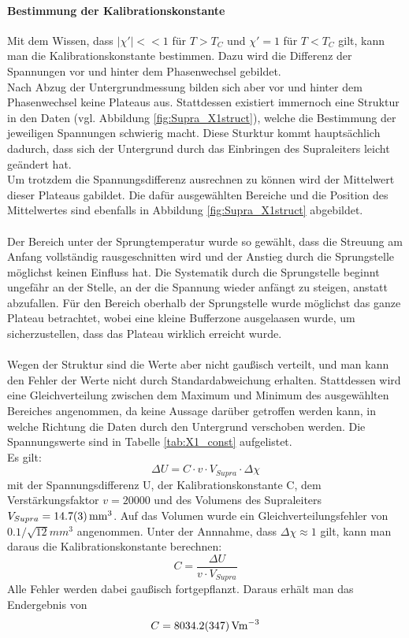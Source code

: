 \documentclass[12pt,a4paper]{article}
\begin{document}
\paragraph{Bestimmung der Kalibrationskonstante}
Mit dem Wissen, dass $|\chi'| << 1$ für $T>T_C$ und $\chi' = 1$ für $T<T_C$ gilt, kann man die Kalibrationskonstante bestimmen. Dazu wird die Differenz der Spannungen vor und hinter dem Phasenwechsel gebildet.\\
Nach Abzug der Untergrundmessung bilden sich aber vor und hinter dem Phasenwechsel keine Plateaus aus. Stattdessen existiert immernoch eine Struktur in den Daten (vgl. Abbildung \ref{fig:Supra_X1struct}), welche die Bestimmung der jeweiligen Spannungen schwierig macht. Diese Sturktur kommt hauptsächlich dadurch, dass sich der Untergrund durch das Einbringen des Supraleiters leicht geändert hat.\\
Um trotzdem die Spannungsdifferenz ausrechnen zu können wird der Mittelwert dieser Plateaus gabildet. Die dafür ausgewählten Bereiche und die Position des Mittelwertes sind ebenfalls in Abbildung \ref{fig:Supra_X1struct} abgebildet.\\
\\
Der Bereich unter der Sprungtemperatur wurde so gewählt, dass die Streuung am Anfang vollständig rausgeschnitten wird und der Anstieg durch die Sprungstelle möglichst keinen Einfluss hat. Die Systematik durch die Sprungstelle beginnt ungefähr an der Stelle, an der die Spannung wieder anfängt zu steigen, anstatt abzufallen. Für den Bereich oberhalb der Sprungstelle wurde möglichst das ganze Plateau betrachtet, wobei eine kleine Bufferzone ausgelaasen wurde, um sicherzustellen, dass das Plateau wirklich erreicht wurde.\\
\\
Wegen der Struktur sind die Werte aber nicht gaußisch verteilt, und man kann den Fehler der Werte nicht durch Standardabweichung erhalten. Stattdessen wird eine Gleichverteilung zwischen dem Maximum und Minimum des ausgewählten Bereiches angenommen, da keine Aussage darüber getroffen werden kann, in welche Richtung die Daten durch den Untergrund verschoben werden. Die Spannungswerte sind in Tabelle \ref{tab:X1_const} aufgelistet.\\
Es gilt:
\begin{equation}
\Delta U = C \cdot v \cdot V_{Supra} \cdot \Delta\chi
\end{equation}
mit der Spannungsdifferenz U, der Kalibrationskonstante C, dem Verstärkungsfaktor $v=20000$ und des Volumens des Supraleiters $V_{Supra} =\SI{ 14.7\pm 0.3}{mm^3}$. Auf das Volumen wurde ein Gleichverteilungsfehler von $0.1/\sqrt{12}mm^3$ angenommen. Unter der Annnahme, dass $\Delta\chi \approx 1$ gilt, kann man daraus die Kalibrationskonstante berechnen:
\begin{equation}
C = \dfrac{\Delta U}{v\cdot V_{Supra}}
\end{equation}
Alle Fehler werden dabei gaußisch fortgepflanzt. Daraus erhält man das Endergebnis von
\begin{equation*}
C = \SI{8034.2\pm 34.7}{Vm^{-3}}
\end{equation*}
\end{document}

